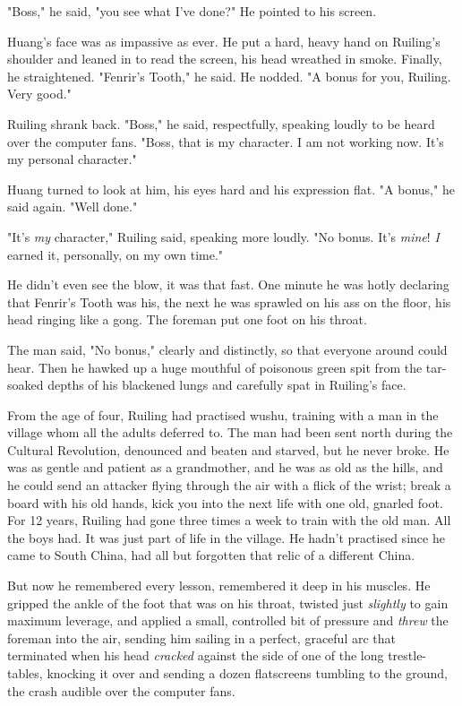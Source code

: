 "Boss," he said, "you see what I've done?" He pointed to his
screen.

Huang's face was as impassive as ever. He put a hard, heavy hand on
Ruiling's shoulder and leaned in to read the screen, his head
wreathed in smoke. Finally, he straightened. "Fenrir's Tooth," he
said. He nodded. "A bonus for you, Ruiling. Very good."

Ruiling shrank back. "Boss," he said, respectfully, speaking loudly
to be heard over the computer fans. "Boss, that is my character. I
am not working now. It's my personal character."

Huang turned to look at him, his eyes hard and his expression flat.
"A bonus," he said again. "Well done."

"It's \emph{my} character," Ruiling said, speaking more loudly. "No
bonus. It's \emph{mine}! \emph{I} earned it, personally, on my own
time."

He didn't even see the blow, it was that fast. One minute he was
hotly declaring that Fenrir's Tooth was his, the next he was
sprawled on his ass on the floor, his head ringing like a gong. The
foreman put one foot on his throat.

The man said, "No bonus," clearly and distinctly, so that everyone
around could hear. Then he hawked up a huge mouthful of poisonous
green spit from the tar-soaked depths of his blackened lungs and
carefully spat in Ruiling's face.

From the age of four, Ruiling had practised wushu, training with a
man in the village whom all the adults deferred to. The man had
been sent north during the Cultural Revolution, denounced and
beaten and starved, but he never broke. He was as gentle and
patient as a grandmother, and he was as old as the hills, and he
could send an attacker flying through the air with a flick of the
wrist; break a board with his old hands, kick you into the next
life with one old, gnarled foot. For 12 years, Ruiling had gone
three times a week to train with the old man. All the boys had. It
was just part of life in the village. He hadn't practised since he
came to South China, had all but forgotten that relic of a
different China.

But now he remembered every lesson, remembered it deep in his
muscles. He gripped the ankle of the foot that was on his throat,
twisted just \emph{slightly} to gain maximum leverage, and applied
a small, controlled bit of pressure and \emph{threw} the foreman
into the air, sending him sailing in a perfect, graceful arc that
terminated when his head \emph{cracked} against the side of one of
the long trestle-tables, knocking it over and sending a dozen
flatscreens tumbling to the ground, the crash audible over the
computer fans.

